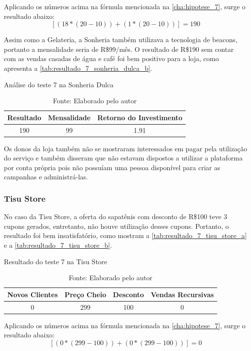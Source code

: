 Aplicando os números acima na fórmula mencionada na \autoref{cha:hipotese_7}, surge o resultado abaixo:
\[[(18 * (20 - 10)) + (1 * (20 - 10))] = 190\]

Assim como a Gelateria, a Sonheria também utilizava a tecnologia de beacons, portanto a mensalidade seria de R\$99/mês. O resultado de R\$190 sem contar com as vendas casadas de água e café foi bem positivo para a loja, como apresenta a \autoref{tab:resultado_7_sonheria_dulca_b}.

\begin{table}[H]
\centering
\caption{Análise do teste 7 na Sonheria Dulca}
\label{tab:resultado_7_sonheria_dulca_b}
\begin{tabular}{|c|c|c|}
\hline
Resultado & Mensalidade & Retorno do Investimento \\ \hline
190             & 99          &   1.91 \\ \hline
\end{tabular}
\caption* {Fonte: Elaborado pelo autor}    
\end{table}

Os donos da loja também não se mostraram interessados em pagar pela utilização do serviço e também disseram que não estavam dispostos a utilizar a plataforma por conta própria pois não possuíam uma pessoa disponível para criar as campanhas e administrá-las.

\subsubsection{Tisu Store}
\label{cha:resultado_tisu_store}
No caso da Tisu Store, a oferta do sapatênis com desconto de R\$100 teve 3 cupons gerados, entretanto, não houve utilização desses cupons. Portanto, o resultado foi bem insatisfatório, como mostram a \autoref{tab:resultado_7_tisu_store_a} e a \autoref{tab:resultado_7_tisu_store_b}.


\begin{table}[H]
\centering
\caption{Resultado do teste 7 na Tisu Store}
\label{tab:resultado_7_tisu_store_a}
\begin{tabular}{|c|c|c|c|}
\hline
Novos Clientes & Preço Cheio & Desconto & Vendas Recursivas \\ \hline
0             & 299          & 100        & 0 \\  \hline
\end{tabular}
\caption* {Fonte: Elaborado pelo autor}    
\end{table}

Aplicando os números acima na fórmula mencionada na \autoref{cha:hipotese_7}, surge o resultado abaixo:
\[[(0 * (299 - 100)) + (0 * (299 - 100))] = 0\]

